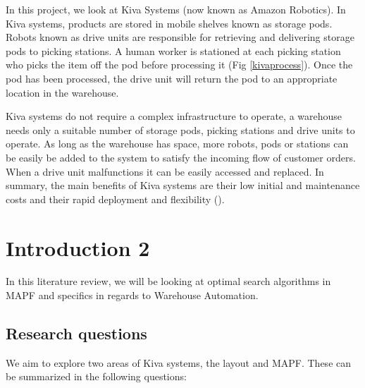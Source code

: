 \documentclass[a4paper,11pt]{article}
\begin{document}
In this project, we look at Kiva Systems (now known as Amazon Robotics). In Kiva systems, products are stored in mobile shelves known as storage pods. Robots known as drive units are responsible for retrieving and delivering storage pods to picking stations. A human worker is stationed at each picking station who picks the item off the pod before processing it (Fig \ref{kivaprocess}). Once the pod has been processed, the drive unit will return the pod to an appropriate location in the warehouse.



Kiva systems do not require a complex infrastructure to operate, a warehouse needs only a suitable number of storage pods, picking stations and drive units to operate. As long as the warehouse has space, more robots, pods or stations can be easily be added to the system to satisfy the incoming flow of customer orders. When a drive unit malfunctions it can be easily accessed and replaced. In summary, the main benefits of Kiva systems are their low initial and maintenance costs and their rapid deployment and flexibility (\cite{wurman2008coordinating}).


\section{Introduction 2}
In this literature review, we will be looking at optimal search algorithms in MAPF and specifics in regards to Warehouse Automation.


\newpage
\subsection{Research questions}
We aim to explore two areas of Kiva systems, the layout and MAPF. These can be summarized in the following questions:
\end{document}
